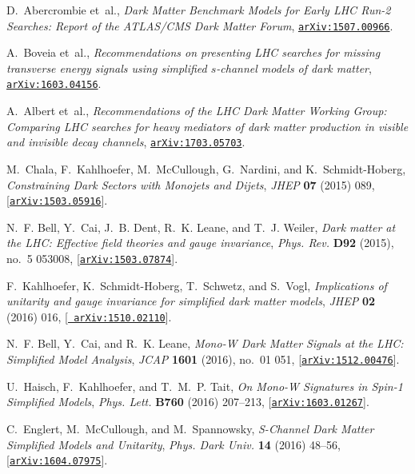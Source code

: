 \documentclass[a4paper, 11pt,notoc]{article}
\begin{document}
\begin{thebibliography}{100}
D.~Abercrombie et~al., {\it {Dark Matter Benchmark Models for Early LHC Run-2
  Searches: Report of the ATLAS/CMS Dark Matter Forum}},
  \href{http://arxiv.org/abs/1507.00966}{{\tt arXiv:1507.00966}}.

A.~Boveia et~al., {\it {Recommendations on presenting LHC searches for missing
  transverse energy signals using simplified $s$-channel models of dark
  matter}},  \href{http://arxiv.org/abs/1603.04156}{{\tt arXiv:1603.04156}}.

A.~Albert et~al., {\it {Recommendations of the LHC Dark Matter Working Group:
  Comparing LHC searches for heavy mediators of dark matter production in
  visible and invisible decay channels}},
  \href{http://arxiv.org/abs/1703.05703}{{\tt arXiv:1703.05703}}.

M.~Chala, F.~Kahlhoefer, M.~McCullough, G.~Nardini, and K.~Schmidt-Hoberg, {\it
  {Constraining Dark Sectors with Monojets and Dijets}},  {\em JHEP} {\bf 07}
  (2015) 089, [\href{http://arxiv.org/abs/1503.05916}{{\tt arXiv:1503.05916}}].

N.~F. Bell, Y.~Cai, J.~B. Dent, R.~K. Leane, and T.~J. Weiler, {\it {Dark
  matter at the LHC: Effective field theories and gauge invariance}},  {\em
  Phys. Rev.} {\bf D92} (2015), no.~5 053008,
  [\href{http://arxiv.org/abs/1503.07874}{{\tt arXiv:1503.07874}}].

F.~Kahlhoefer, K.~Schmidt-Hoberg, T.~Schwetz, and S.~Vogl, {\it {Implications
  of unitarity and gauge invariance for simplified dark matter models}},  {\em
  JHEP} {\bf 02} (2016) 016, [\href{http://arxiv.org/abs/1510.02110}{{\tt
  arXiv:1510.02110}}].

N.~F. Bell, Y.~Cai, and R.~K. Leane, {\it {Mono-W Dark Matter Signals at the
  LHC: Simplified Model Analysis}},  {\em JCAP} {\bf 1601} (2016), no.~01 051,
  [\href{http://arxiv.org/abs/1512.00476}{{\tt arXiv:1512.00476}}].

U.~Haisch, F.~Kahlhoefer, and T.~M.~P. Tait, {\it {On Mono-W Signatures in
  Spin-1 Simplified Models}},  {\em Phys. Lett.} {\bf B760} (2016) 207--213,
  [\href{http://arxiv.org/abs/1603.01267}{{\tt arXiv:1603.01267}}].

C.~Englert, M.~McCullough, and M.~Spannowsky, {\it {S-Channel Dark Matter
  Simplified Models and Unitarity}},  {\em Phys. Dark Univ.} {\bf 14} (2016)
  48--56, [\href{http://arxiv.org/abs/1604.07975}{{\tt arXiv:1604.07975}}].


\end{thebibliography}
\end{document}
